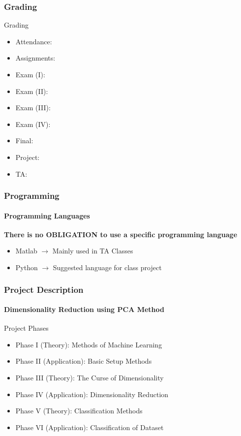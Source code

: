 \documentclass{beamer}
\begin{document}
\begin{frame}
  \frametitle{Grading}
  \begin{alertblock}{Grading}
    \begin{itemize}
      \item Attendance:
      \item Assignments:
      \item Exam (I):
      \item Exam (II):
      \item Exam (III):
      \item Exam (IV):
      \item Final:
      \item Project:
      \item TA:
    \end{itemize}
  \end{alertblock}
\end{frame}

\begin{frame}
  \frametitle{Programming}
  \framesubtitle{Programming Languages}
\textbf{There is no OBLIGATION to use a specific programming language}

\begin{itemize}
  \item Matlab $\rightarrow$ Mainly used in TA Classes
  \item Python $\rightarrow$ Suggested language for class project
\end{itemize}

\end{frame}

\begin{frame}
  \frametitle{Project Description}
  \framesubtitle{Dimensionality Reduction using PCA Method}
  \begin{block}{Project Phases}
    \begin{itemize}
      \item Phase I (Theory): Methods of Machine Learning
      \item Phase II (Application): Basic Setup Methods
      \item Phase III (Theory): The Curse of Dimensionality
      \item Phase IV (Application): Dimensionality Reduction
      \item Phase V (Theory): Classification Methods
      \item Phase VI (Application): Classification of Dataset
    \end{itemize}
  \end{block}
  
\end{frame}
\end{document}
